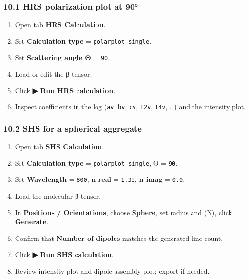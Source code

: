 \hypertarget{hrs-polarization-plot-at-90}{%
\subsubsection{10.1 HRS polarization plot at
90°}\label{hrs-polarization-plot-at-90}}

\begin{enumerate}
\def\labelenumi{\arabic{enumi}.}
\tightlist
\item
  Open tab \textbf{HRS Calculation}.\\
\item
  Set \textbf{Calculation type} = \texttt{polarplot\_single}.\\
\item
  Set \textbf{Scattering angle Θ} = \texttt{90}.\\
\item
  Load or edit the β tensor.\\
\item
  Click \textbf{▶ Run HRS calculation}.\\
\item
  Inspect coefficients in the log (\texttt{av}, \texttt{bv},
  \texttt{cv}, \texttt{I2v}, \texttt{I4v}, \ldots) and the intensity
  plot.
\end{enumerate}

\hypertarget{shs-for-a-spherical-aggregate}{%
\subsubsection{10.2 SHS for a spherical
aggregate}\label{shs-for-a-spherical-aggregate}}

\begin{enumerate}
\def\labelenumi{\arabic{enumi}.}
\tightlist
\item
  Open tab \textbf{SHS Calculation}.\\
\item
  Set \textbf{Calculation type} = \texttt{polarplot\_single}, Θ =
  \texttt{90}.\\
\item
  Set \textbf{Wavelength} = \texttt{800}, \textbf{n real} =
  \texttt{1.33}, \textbf{n imag} = \texttt{0.0}.\\
\item
  Load the molecular β tensor.\\
\item
  In \textbf{Positions / Orientations}, choose \textbf{Sphere}, set
  radius and (N), click \textbf{Generate}.\\
\item
  Confirm that \textbf{Number of dipoles} matches the generated line
  count.\\
\item
  Click \textbf{▶ Run SHS calculation}.\\
\item
  Review intensity plot and dipole assembly plot; export if needed.
\end{enumerate}

